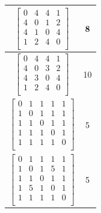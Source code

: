 \documentclass[a4paper,14pt]{report}
\begin{document}
\begin{table}[h]
\begin{tabular}{|c | c |}
		$\begin{bmatrix}
		0 & 4 & 4 & 1 \\
		4 & 0 & 1 & 2 \\
		4 & 1 & 0 & 4 \\
		1 & 2 & 4 & 0 \\
		\end{bmatrix}$ & 8 \\
		\hline

		$\begin{bmatrix}
		0 & 4 & 4 & 1 \\
		4 & 0 & 3 & 2 \\
		4 & 3 & 0 & 4 \\
		1 & 2 & 4 & 0 \\
		\end{bmatrix}$ & 10 \\
		\hline

		$\begin{bmatrix}
		0 & 1 & 1 & 1 & 1 \\
		1 & 0 & 1 & 1 & 1 \\
		1 & 1 & 0 & 1 & 1 \\
		1 & 1 & 1 & 0 & 1 \\
		1 & 1 & 1 & 1 & 0 \\
		\end{bmatrix}$ & 5 \\
		\hline

		$\begin{bmatrix}
		0 & 1 & 1 & 1 & 1 \\
		1 & 0 & 1 & 5 & 1 \\
		1 & 1 & 0 & 1 & 1 \\
		1 & 5 & 1 & 0 & 1 \\
		1 & 1 & 1 & 1 & 0 \\
		\end{bmatrix}$ & 5 \\
		\hline

	\end{tabular}
\end{table}
\end{document}
